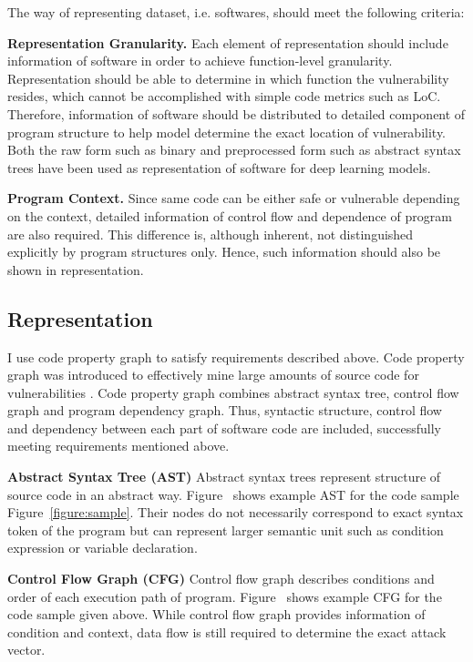 The way of representing dataset, i.e. softwares, should meet the following criteria:

\textbf{Representation Granularity.}
Each element of representation should include information of software in order to achieve function-level granularity.
Representation should be able to determine in which function the vulnerability resides, which cannot be accomplished with simple code metrics such as LoC.
Therefore, information of software should be distributed to detailed component of program structure to help model determine the exact location of vulnerability.
Both the raw form such as binary \cite{shin2015recognizing, kosmidis2017machine} and preprocessed form such as abstract syntax trees \cite{wang2016automatically}
have been used as representation of software for deep learning models.

\textbf{Program Context.}
Since same code can be either safe or vulnerable depending on the context,
detailed information of control flow and dependence of program are also required.
This difference is, although inherent, not distinguished explicitly by program structures only.
Hence, such information should also be shown in representation.

\subsection{Representation}
I use code property graph to satisfy requirements described above.
Code property graph was introduced to effectively mine large amounts of source code for vulnerabilities \cite{yamaguchi2014modeling}.
Code property graph combines abstract syntax tree, control flow graph and program dependency graph.
Thus, syntactic structure, control flow and dependency between each part of software code are included, successfully meeting requirements mentioned above.

\textbf{Abstract Syntax Tree (AST)}
Abstract syntax trees represent structure of source code in an abstract way.
Figure~ shows example AST for the code sample Figure~\ref{figure:sample}.
Their nodes do not necessarily correspond to exact syntax token of the program but can represent larger semantic unit such as condition expression or variable declaration.

\textbf{Control Flow Graph (CFG)}
Control flow graph describes conditions and order of each execution path of program.
Figure~ shows example CFG for the code sample given above.
While control flow graph provides information of condition and context, data flow is still required to determine the exact attack vector.

